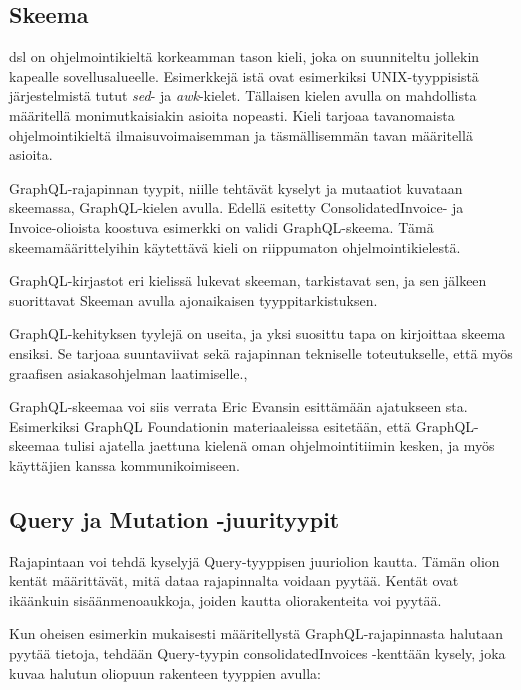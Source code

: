 \hypertarget{skeema}{%
\subsection{Skeema}\label{skeema}}

\Gls{dsl} on ohjelmointikieltä korkeamman tason kieli, joka on
suunniteltu jollekin kapealle sovellusalueelle. Esimerkkejä
istä ovat esimerkiksi UNIX-tyyppisistä järjestelmistä
tutut \emph{sed}- ja \emph{awk}-kielet. Tällaisen kielen avulla on
mahdollista määritellä monimutkaisiakin asioita
nopeasti.\cite{Raymond2003Sep} Kieli tarjoaa tavanomaista
ohjelmointikieltä ilmaisuvoimaisemman ja täsmällisemmän tavan määritellä
asioita.

GraphQL-rajapinnan tyypit, niille tehtävät kyselyt ja mutaatiot kuvataan
skeemassa, GraphQL-kielen avulla. Edellä esitetty ConsolidatedInvoice-
ja Invoice-olioista koostuva esimerkki on validi GraphQL-skeema. Tämä
skeemamäärittelyihin käytettävä kieli on riippumaton
ohjelmointikielestä.

GraphQL-kirjastot eri kielissä lukevat skeeman, tarkistavat sen, ja sen
jälkeen suorittavat Skeeman avulla ajonaikaisen tyyppitarkistuksen.

GraphQL-kehityksen tyylejä on useita, ja yksi suosittu tapa on
kirjoittaa skeema ensiksi. Se tarjoaa suuntaviivat sekä rajapinnan
tekniselle toteutukselle, että myös graafisen asiakasohjelman
laatimiselle.\cite{SchemaDriven2017Nov},\cite{SchemaDrivenDesign2021Jul}

GraphQL-skeemaa voi siis verrata Eric Evansin esittämään ajatukseen
sta. Esimerkiksi GraphQL Foundationin
materiaaleissa esitetään, että GraphQL-skeemaa tulisi ajatella jaettuna
kielenä oman ohjelmointitiimin kesken, ja myös käyttäjien kanssa
kommunikoimiseen.\cite{thinkingInGraphsOct2021}

\hypertarget{query-ja-mutation--juurityypit}{%
\subsection{Query ja Mutation
-juurityypit}\label{query-ja-mutation--juurityypit}}

Rajapintaan voi tehdä kyselyjä Query-tyyppisen juuriolion kautta. Tämän
olion kentät määrittävät, mitä dataa rajapinnalta voidaan pyytää. Kentät
ovat ikäänkuin sisäänmenoaukkoja, joiden kautta oliorakenteita voi
pyytää.

Kun oheisen esimerkin mukaisesti määritellystä GraphQL-rajapinnasta
halutaan pyytää tietoja, tehdään Query-tyypin consolidatedInvoices
-kenttään kysely, joka kuvaa halutun oliopuun rakenteen tyyppien avulla:

